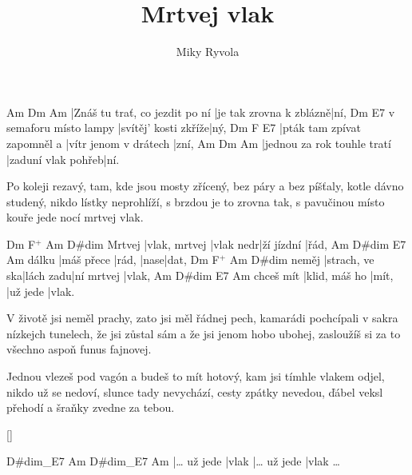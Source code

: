 \documentclass{song}
\title{Mrtvej vlak}
\author{Miky Ryvola}
\newcommand{\+}{$^+$}
\begin{document}
\strophe
Am                             Dm                      Am
|Znáš tu trať, co jezdit po ní |je tak zrovna k zblázně|ní,
                       Dm                   E7
v semaforu místo lampy |svítěj' kosti zkříže|ný,
Dm                          F                     E7
|pták tam zpívat zapomněl a |vítr jenom v drátech |zní,
Am                          Dm                 Am
|jednou za rok touhle tratí |zaduní vlak pohřeb|ní.
\endstrophe

\strophe*
Po koleji rezavý, tam, kde jsou mosty zřícený,
bez páry a bez píšťaly, kotle dávno studený,
nikdo lístky neprohlíží, s brzdou je to zrovna tak,
s pavučinou místo kouře jede nocí mrtvej vlak.
\endstrophe

       Dm            F\+       Am         D#dim
Mrtvej |vlak, mrtvej |vlak nedr|ží jízdní |řád,
      Am         D#dim E7   Am
dálku |máš přece |rád, |nase|dat,
      Dm             F\+       Am         D#dim
neměj |strach, ve ska|lách zadu|ní mrtvej |vlak,
          Am            D#dim E7       Am
chceš mít |klid, máš ho |mít, |už jede |vlak.
\endstrophe

\strophe*
V životě jsi neměl prachy, zato jsi měl řádnej pech,
kamarádi pochcípali v sakra nízkejch tunelech,
že jsi zůstal sám a že jsi jenom hobo ubohej,
zasloužíš si za to všechno aspoň funus fajnovej.
\endstrophe

\strophe*
Jednou vlezeš pod vagón a budeš to mít hotový,
kam jsi tímhle vlakem odjel, nikdo už se nedoví,
slunce tady nevychází, cesty zpátky nevedou,
ďábel veksl přehodí a šraňky zvedne za tebou.
\endstrophe

\ref{}

\strophe
D#dim_E7          Am    D#dim_E7          Am
|\ldots{} už jede |vlak |\ldots{} už jede |vlak \ldots{}
\endstrophe

\end{document}

